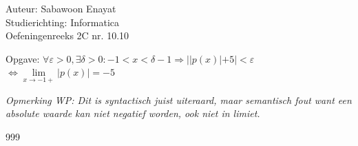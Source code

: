 \documentclass[a4paper]{article}
\begin{document}
  
\noindent \large Auteur: Sabawoon Enayat      \\
\noindent \large Studierichting: Informatica  \\
\noindent \large Oefeningenreeks 2C nr. 10.10 \\

\newcommand{\llim}{\lim\limits}

\medskip

\normalsize

Opgave: $\forall \varepsilon > 0, \exists \delta > 0: -1 < x < \delta - 1 \Rightarrow ||p(x)| + 5| < \varepsilon$\\

$\Leftrightarrow \llim_{x \to -1+} |p(x)| = -5$\\

\bigskip

\emph{Opmerking WP: Dit is syntactisch juist uiteraard, maar semantisch fout want een absolute waarde kan niet negatief worden, ook niet in limiet.}
\begin{thebibliography}{999}
\end{thebibliography}
\end{document}
